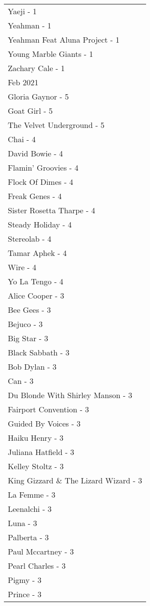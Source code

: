 \documentclass[
]{article}
\begin{document}
\begin{longtable}{l}
Yaeji - 1 \\ 
Yeahman - 1 \\ 
Yeahman Feat Aluna Project - 1 \\ 
Young Marble Giants - 1 \\ 
Zachary Cale - 1 \\ 
\midrule
\multicolumn{1}{l}{Feb 2021} \\ 
\midrule
Gloria Gaynor - 5 \\ 
Goat Girl - 5 \\ 
The Velvet Underground - 5 \\ 
Chai - 4 \\ 
David Bowie - 4 \\ 
Flamin' Groovies - 4 \\ 
Flock Of Dimes - 4 \\ 
Freak Genes - 4 \\ 
Sister Rosetta Tharpe - 4 \\ 
Steady Holiday - 4 \\ 
Stereolab - 4 \\ 
Tamar Aphek - 4 \\ 
Wire - 4 \\ 
Yo La Tengo - 4 \\ 
Alice Cooper - 3 \\ 
Bee Gees - 3 \\ 
Bejuco - 3 \\ 
Big Star - 3 \\ 
Black Sabbath - 3 \\ 
Bob Dylan - 3 \\ 
Can - 3 \\ 
Du Blonde With Shirley Manson - 3 \\ 
Fairport Convention - 3 \\ 
Guided By Voices - 3 \\ 
Haiku Henry - 3 \\ 
Juliana Hatfield - 3 \\ 
Kelley Stoltz - 3 \\ 
King Gizzard \& The Lizard Wizard - 3 \\ 
La Femme - 3 \\ 
Leenalchi - 3 \\ 
Luna - 3 \\ 
Palberta - 3 \\ 
Paul Mccartney - 3 \\ 
Pearl Charles - 3 \\ 
Pigmy - 3 \\ 
Prince - 3 \\ 

\end{longtable}
\end{document}
